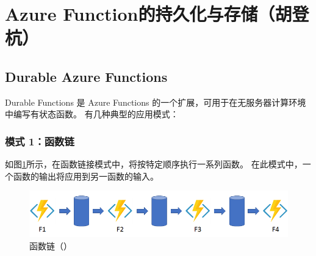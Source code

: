 \section{Azure Function的持久化与存储（胡登杭）}
\subsection{Durable Azure Functions}
Durable Functions 是 Azure Functions 的一个扩展，可用于在无服务器计算环境中编写有状态函数。  
有几种典型的应用模式：
\subsubsection{模式 1：函数链}
如图\ref{fig:model1}所示，在函数链接模式中，将按特定顺序执行一系列函数。 在此模式中，一个函数的输出将应用到另一函数的输入。
\begin{figure}[!htbp]
	\centering
	\includegraphics[width=0.8\linewidth]{figs/model1}
	\caption{函数链（\cite{Durable}）}
	\label{fig:model1}
\end{figure}

